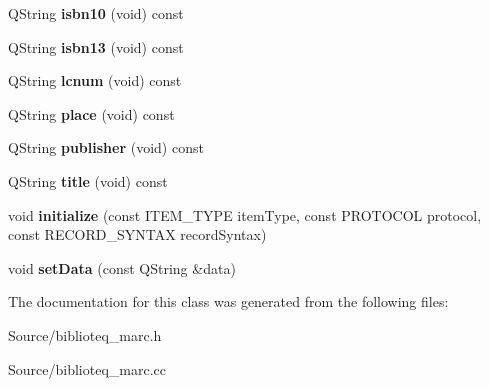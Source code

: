 \begin{DoxyCompactItemize}
\item 
Q\+String {\bfseries isbn10} (void) const \hypertarget{classbiblioteq__marc_a8d7e7db6b16a8508cd19bb47dd9506bd}{}\label{classbiblioteq__marc_a8d7e7db6b16a8508cd19bb47dd9506bd}

\item 
Q\+String {\bfseries isbn13} (void) const \hypertarget{classbiblioteq__marc_ae76d61f22d5530001f061f76fde49d56}{}\label{classbiblioteq__marc_ae76d61f22d5530001f061f76fde49d56}

\item 
Q\+String {\bfseries lcnum} (void) const \hypertarget{classbiblioteq__marc_a89d5f7c48f824cdd895e8cee666cb55f}{}\label{classbiblioteq__marc_a89d5f7c48f824cdd895e8cee666cb55f}

\item 
Q\+String {\bfseries place} (void) const \hypertarget{classbiblioteq__marc_a4fbb891caebe264bfb7d67daec29126c}{}\label{classbiblioteq__marc_a4fbb891caebe264bfb7d67daec29126c}

\item 
Q\+String {\bfseries publisher} (void) const \hypertarget{classbiblioteq__marc_a9bea2245077af2dfcf637aaef65904c3}{}\label{classbiblioteq__marc_a9bea2245077af2dfcf637aaef65904c3}

\item 
Q\+String {\bfseries title} (void) const \hypertarget{classbiblioteq__marc_a204d826222b9de455ba72663ffd3e818}{}\label{classbiblioteq__marc_a204d826222b9de455ba72663ffd3e818}

\item 
void {\bfseries initialize} (const I\+T\+E\+M\+\_\+\+T\+Y\+PE item\+Type, const P\+R\+O\+T\+O\+C\+OL protocol, const R\+E\+C\+O\+R\+D\+\_\+\+S\+Y\+N\+T\+AX record\+Syntax)\hypertarget{classbiblioteq__marc_a4ef0032f2b603e4c9a48f6c7359a7b6e}{}\label{classbiblioteq__marc_a4ef0032f2b603e4c9a48f6c7359a7b6e}

\item 
void {\bfseries set\+Data} (const Q\+String \&data)\hypertarget{classbiblioteq__marc_ae53d113de9c4794a0e479519dcc8292a}{}\label{classbiblioteq__marc_ae53d113de9c4794a0e479519dcc8292a}

\end{DoxyCompactItemize}


The documentation for this class was generated from the following files\+:\begin{DoxyCompactItemize}
\item 
Source/biblioteq\+\_\+marc.\+h\item 
Source/biblioteq\+\_\+marc.\+cc\end{DoxyCompactItemize}
